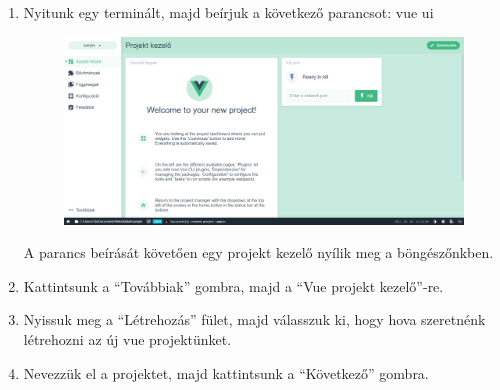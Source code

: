 \begin{enumerate}
  \item Nyitunk egy terminált, majd beírjuk a következő parancsot: vue ui
\begin{figure}[h!]
\centering
\includegraphics[width=\textwidth]{images/1617369552704.png}
\label{fig:ff}
\end{figure}
A parancs beírását követően egy projekt kezelő nyílik meg a böngészőnkben.
\newpage
  \item Kattintsunk a “Továbbiak” gombra, majd a “Vue projekt kezelő”-re.
  \item Nyissuk meg a “Létrehozás” fület, majd válasszuk ki, hogy hova szeretnénk létrehozni az új vue projektünket.

  \item Nevezzük el a projektet, majd kattintsunk a “Következő” gombra.


\end{enumerate}

